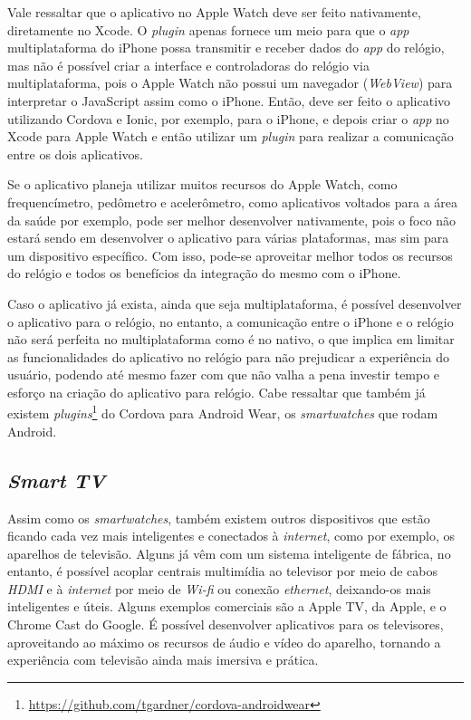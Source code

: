 Vale ressaltar que o aplicativo no Apple Watch deve ser feito nativamente, diretamente no Xcode. O \textit{plugin} apenas fornece um meio para que o \textit{app} multiplataforma do iPhone possa transmitir e receber 
dados do \textit{app} do relógio, mas não é possível criar a interface e controladoras do relógio via multiplataforma, pois o Apple Watch não possui um navegador (\textit{WebView}) para interpretar o JavaScript assim 
como o iPhone. Então, deve ser feito o aplicativo utilizando Cordova e Ionic, por exemplo, para o iPhone, e depois criar o \textit{app} no Xcode para Apple Watch e então utilizar um \textit{plugin} para realizar a 
comunicação entre os dois aplicativos.  

Se o aplicativo planeja utilizar muitos recursos do Apple Watch, como frequencímetro, pedômetro e acelerômetro, como aplicativos voltados para a área da saúde por exemplo, pode ser melhor desenvolver nativamente,
pois o foco não estará sendo em desenvolver o aplicativo para várias plataformas, mas sim para um dispositivo específico. Com isso, pode-se aproveitar melhor todos os recursos do relógio e todos os benefícios da integração
do mesmo com o iPhone.

Caso o aplicativo já exista, ainda que seja multiplataforma, é possível desenvolver o aplicativo para o relógio, no entanto, a comunicação entre o iPhone e o relógio não será perfeita no multiplataforma como é no nativo, 
o que implica em limitar as funcionalidades do aplicativo no relógio para não prejudicar a experiência do usuário, podendo até mesmo fazer com que não valha a pena investir tempo e esforço na criação do aplicativo para
relógio. Cabe ressaltar que também já existem \textit{plugins}\footnote{\url{https://github.com/tgardner/cordova-androidwear}} do Cordova para Android Wear, os \textit{smartwatches} que rodam Android.

\subsection{\textit{Smart TV}} \label{subsec:tv}
Assim como os \textit{smartwatches}, também existem outros dispositivos que estão ficando cada vez mais inteligentes e conectados à \textit{internet}, como por exemplo, os aparelhos de televisão. Alguns já vêm
com um sistema inteligente de fábrica, no entanto, é possível acoplar centrais multimídia ao televisor por meio de cabos \textit{HDMI} e à \textit{internet} por meio de \textit{Wi-fi} ou conexão \textit{ethernet}, 
deixando-os mais inteligentes e úteis. Alguns exemplos comerciais são a Apple TV, da Apple, e o Chrome Cast do Google. É possível desenvolver aplicativos para os televisores, aproveitando ao máximo os recursos de 
áudio e vídeo do aparelho, tornando a experiência com televisão ainda mais imersiva e prática. 

